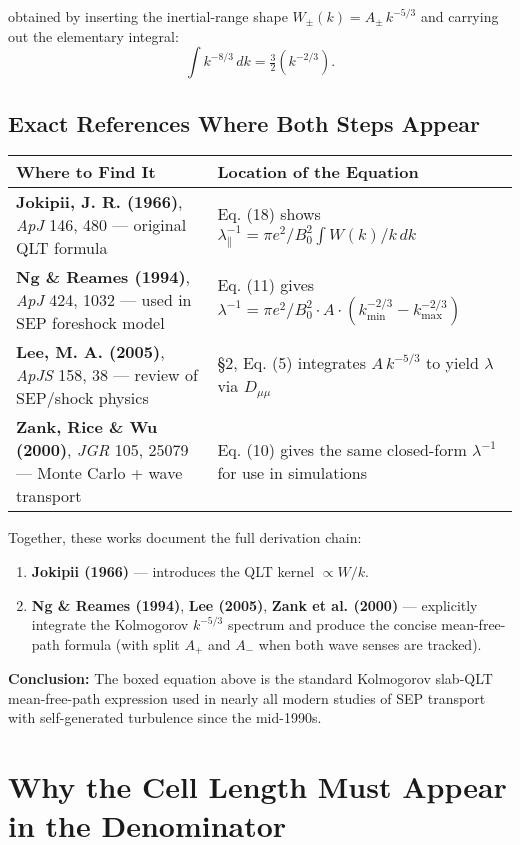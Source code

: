 obtained by inserting the inertial-range shape $W_\pm(k) = A_\pm\,k^{-5/3}$ and carrying out the elementary integral:
\[
\int k^{-8/3}\,dk = \tfrac{3}{2} \left(k^{-2/3}\right).
\]

\subsection*{Exact References Where Both Steps Appear}

\begin{tabular}{@{}p{10cm}p{5.3cm}@{}}
\toprule
\textbf{Where to Find It} & \textbf{Location of the Equation} \\
\midrule
\textbf{Jokipii, J. R. (1966)}, \textit{ApJ} 146, 480 — original QLT formula & Eq. (18) shows $\lambda_\parallel^{-1} = \pi e^2 / B_0^2 \int W(k)/k\,dk$ \\
\textbf{Ng \& Reames (1994)}, \textit{ApJ} 424, 1032 — used in SEP foreshock model & Eq. (11) gives $\lambda^{-1} = \pi e^2 / B_0^2 \cdot A \cdot (k_{\min}^{-2/3} - k_{\max}^{-2/3})$ \\
\textbf{Lee, M. A. (2005)}, \textit{ApJS} 158, 38 — review of SEP/shock physics & §2, Eq. (5) integrates $A\,k^{-5/3}$ to yield $\lambda$ via $D_{\mu\mu}$ \\
\textbf{Zank, Rice \& Wu (2000)}, \textit{JGR} 105, 25079 — Monte Carlo + wave transport & Eq. (10) gives the same closed-form $\lambda^{-1}$ for use in simulations \\
\bottomrule
\end{tabular}

\bigskip

Together, these works document the full derivation chain:

\begin{enumerate}
  \item \textbf{Jokipii (1966)} — introduces the QLT kernel $\propto W/k$.
  \item \textbf{Ng \& Reames (1994)}, \textbf{Lee (2005)}, \textbf{Zank et al. (2000)} — explicitly integrate the Kolmogorov $k^{-5/3}$ spectrum and produce the concise mean-free-path formula (with split $A_+$ and $A_-$ when both wave senses are tracked).
\end{enumerate}

\textbf{Conclusion:}  
The boxed equation above is the standard Kolmogorov slab-QLT mean-free-path expression used in nearly all modern studies of SEP transport with self-generated turbulence since the mid-1990s.

\section*{Why the Cell Length  Must Appear in the Denominator}

